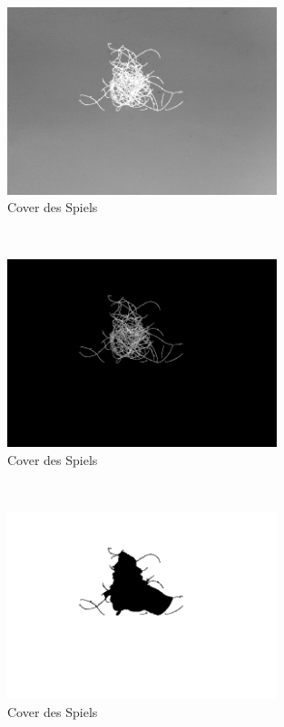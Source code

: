 \documentclass[german,a4paper,12pt,smallheadings,headsepline, titlepage, liststotoc, idextotoc,bibtoctoc,blibliography = totocnumbered]{scrartcl}
\begin{document}
\begin{figure}
	\centering
	\includegraphics[width=0.7\textwidth]{figBina/07missed hair.png}
	\caption[]{Cover des Spiels}
	\label{img:Bina01}
\end{figure}\\
\begin{figure}
	\centering
	\includegraphics[width=0.7\textwidth]{figBina/08input intensity.png}
	\caption[]{Cover des Spiels}
	\label{img:Bina01}
\end{figure}\\
\begin{figure}
	\centering
	\includegraphics[width=0.7\textwidth]{figBina/08outer section.png}
	\caption[]{Cover des Spiels}
	\label{img:Bina01}
\end{figure}\\
\end{document}
